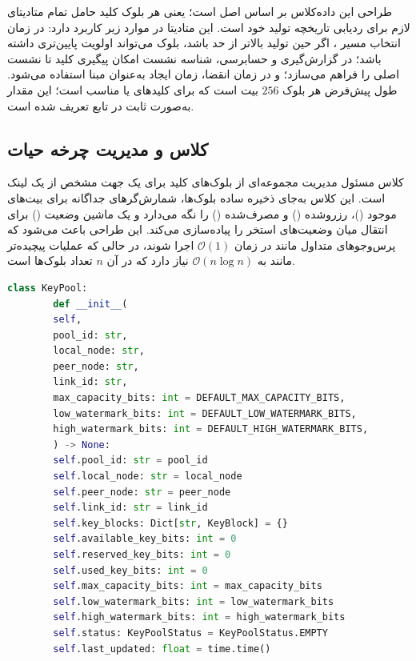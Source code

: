 طراحی این داده‌کلاس بر اساس اصل  است؛ یعنی هر بلوک کلید حامل تمام متادیتای لازم برای ردیابی تاریخچه تولید خود است. این متادیتا در موارد زیر کاربرد دارد: در زمان انتخاب مسیر ، اگر  حین تولید بالاتر از حد باشد، بلوک می‌تواند اولویت پایین‌تری داشته باشد؛ در گزارش‌گیری و حسابرسی، شناسه نشست  امکان پیگیری کلید تا نشست اصلی را فراهم می‌سازد؛ و در زمان انقضا، زمان ایجاد به‌عنوان مبنا استفاده می‌شود. طول پیش‌فرض هر بلوک $256$ بیت است که برای کلیدهای  یا  مناسب است؛ این مقدار به‌صورت ثابت در تابع  تعریف شده است.

\subsection{کلاس  و مدیریت چرخه حیات}

کلاس  مسئول مدیریت مجموعه‌ای از بلوک‌های کلید برای یک جهت مشخص از یک لینک  است. این کلاس به‌جای ذخیره ساده بلوک‌ها، شمارش‌گرهای جداگانه برای بیت‌های موجود ()، رزروشده () و مصرف‌شده () را نگه می‌دارد و یک ماشین وضعیت () برای انتقال میان وضعیت‌های استخر را پیاده‌سازی می‌کند. این طراحی باعث می‌شود که پرس‌وجوهای متداول مانند  در زمان $\mathcal{O}(1)$ اجرا شوند، در حالی که عملیات پیچیده‌تر مانند  به $\mathcal{O}(n \log n)$ نیاز دارد که در آن $n$ تعداد بلوک‌ها است.

\begin{LTR}
	\begin{lstlisting}[language=Python]
		class KeyPool:
		def __init__(
		self,
		pool_id: str,
		local_node: str,
		peer_node: str,
		link_id: str,
		max_capacity_bits: int = DEFAULT_MAX_CAPACITY_BITS,
		low_watermark_bits: int = DEFAULT_LOW_WATERMARK_BITS,
		high_watermark_bits: int = DEFAULT_HIGH_WATERMARK_BITS,
		) -> None:
		self.pool_id: str = pool_id
		self.local_node: str = local_node
		self.peer_node: str = peer_node
		self.link_id: str = link_id
		self.key_blocks: Dict[str, KeyBlock] = {}
		self.available_key_bits: int = 0
		self.reserved_key_bits: int = 0
		self.used_key_bits: int = 0
		self.max_capacity_bits: int = max_capacity_bits
		self.low_watermark_bits: int = low_watermark_bits
		self.high_watermark_bits: int = high_watermark_bits
		self.status: KeyPoolStatus = KeyPoolStatus.EMPTY
		self.last_updated: float = time.time()
	\end{lstlisting}
\end{LTR}

